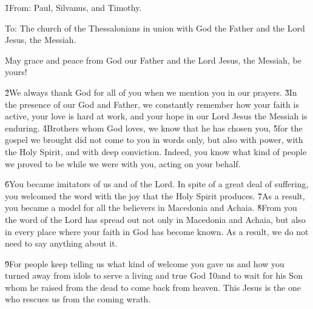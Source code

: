 


\v{1}From: Paul, Silvanus, and Timothy.

To: The church of the Thessalonians in union with God the Father and the Lord Jesus, the Messiah.

May grace and peace from God our Father and the Lord Jesus, the Messiah, be yours!

\v{2}We always thank God for all of you when we mention you in our prayers. \v{3}In the presence of our God and Father, we constantly remember how your faith is active, your love is hard at work, and your hope in our Lord Jesus the Messiah is enduring. \v{4}Brothers whom God loves, we know that he has chosen you, \v{5}for the gospel we brought did not come to you in words only, but also with power, with the Holy Spirit, and with deep conviction. Indeed, you know what kind of people we proved to be while we were with you, acting on your behalf.

\v{6}You became imitators of us and of the Lord. In spite of a great deal of suffering, you welcomed the word with the joy that the Holy Spirit produces. \v{7}As a result, you became a model for all the believers in Macedonia and Achaia. \v{8}From you the word of the Lord has spread out not only in Macedonia and Achaia, but also in every place where your faith in God has become known. As a result, we do not need to say anything about it.

\v{9}For people keep telling us what kind of welcome you gave us and how you turned away from idols to serve a living and true God \v{10}and to wait for his Son whom he raised from the dead to come back from heaven. This Jesus is the one who rescues us from the coming wrath.

